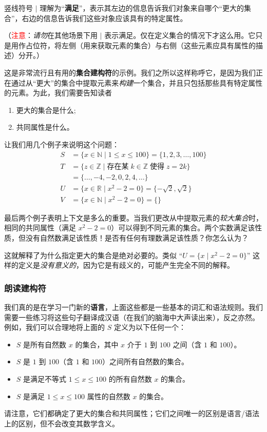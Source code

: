 竖线符号 $\mid$ 理解为``\textbf{满足}''，表示其左边的信息告诉我们对象来自哪个``更大的集合''，右边的信息告诉我们这些对象应该具有的特定属性。

（\textcolor{red}{注意}：\textit{请勿}在其他场景下用 $\mid$ 表示满足。仅在定义集合的情况下才这么用。它只是用作占位符，将左侧（用来获取元素的集合）与右侧（这些元素应具有属性的描述）分开。）

这是非常流行且有用的\textbf{集合建构符}的示例。我们之所以这样称呼它，是因为我们正在通过从``更大''的集合中提取元素来\textit{构建}一个集合，并且只包括那些具有特定属性的元素。为此，我们需要告知读者
\begin{enumerate}[label=(\arabic*)]
    \item 更大的集合是什么;
    \item 共同属性是什么。
\end{enumerate}
让我们用几个例子来说明这个问题：
\begin{align*}
    S &= \{x \in \mathbb{N} \mid 1 \le x \le 100\} = \{1, 2, 3, \dots , 100\} \\
    T &= \{z \in \mathbb{Z} \mid \text{存在某}\; k \in \mathbb{Z} \;\text{使得}\; z = 2k\} \\
      &= \{\dots , -4, -2, 0, 2, 4, \dots\} \\
    U &= \{x \in \mathbb{R} \mid x^2 - 2 = 0\} = \{-\sqrt{2}, \sqrt{2}\}\\
    V &= \{x \in \mathbb{N} \mid x^2 - 2 = 0\}= \{ \}
\end{align*}

最后两个例子表明上下文是多么的重要。当我们更改从中提取元素的\textit{较大集合}时，相同的共同属性（满足 $x^2 -2 = 0$）可以得到不同元素的集合。两个实数满足该性质，但没有自然数满足该性质！是否有任何有理数满足该性质？你怎么认为？

这就解释了为什么指定更大的集合是绝对必要的。类似 ``$U = \{x \mid x^2 - 2 = 0\}$'' 这样的定义是\textit{没有意义的}，因为它是有歧义的，可能产生完全不同的解释。

\subsubsection*{朗读建构符}

我们真的是在学习一门新的\textbf{语言}，上面这些都是一些基本的词汇和语法规则。我们需要一些练习将这些句子翻译成汉语（在我们的脑海中大声读出来），反之亦然。例如，我们可以合理地将上面的 $S$ 定义为以下任何一个：

\begin{itemize}
    \item $S$ 是所有自然数 $x$ 的集合，其中 $x$ 介于 $1$ 到 $100$ 之间（含 $1$ 和 $100$）。
    \item $S$ 是 $1$ 到 $100$（含 $1$ 和 $100$）之间所有自然数的集合。
    \item $S$ 是满足不等式 $1 \le x \le 100$ 的所有自然数 $x$ 的集合。
    \item $S$ 是满足 $1 \le x \le 100$ 属性的自然数 $x$ 的集合。
\end{itemize}
请注意，它们都确定了更大的集合和共同属性；它们之间唯一的区别是语言/语法上的区别，但不会改变其数学含义。

